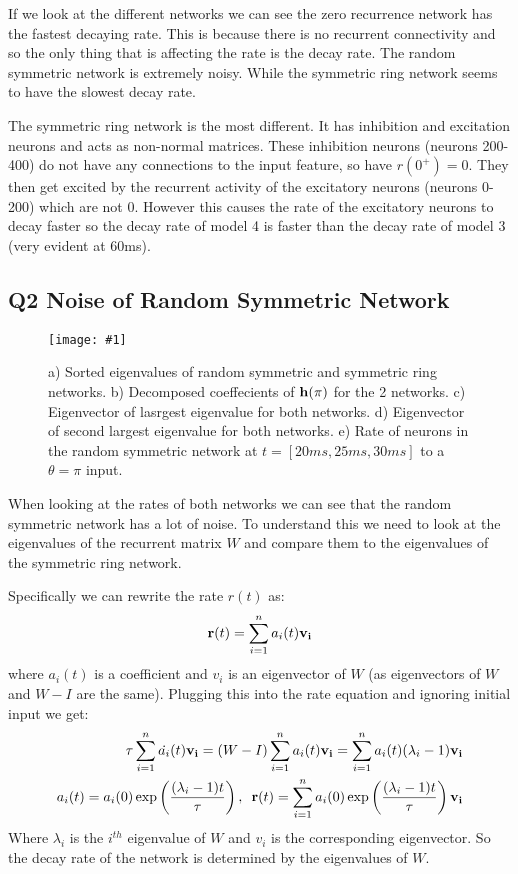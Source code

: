 \documentclass[a4paper, 11pt, oneside]{report}
\newcommand{\centreImage}[2]{
	\begin{figure}[H]
		\centering
		\texttt{[image: \#1]}
		\caption{#2}
        \label{fig:#1}
	\end{figure}
}
\begin{document}
If we look at the different networks we can see the zero recurrence network has the fastest
decaying rate. This is because there is no recurrent connectivity and so the only thing that is affecting the rate is
the decay rate. The random symmetric network is extremely noisy. While the 
symmetric ring network seems to have the slowest decay rate.

The symmetric ring network is the most different. It has inhibition and excitation neurons and acts as non-normal matrices.
These inhibition neurons (neurons 200-400) do not have any connections to the input feature, so
have $r(0^+)=0$. They then get excited by the recurrent activity of the excitatory neurons (neurons 0-200)
which are not 0. However this causes the rate of the excitatory neurons to decay faster so the
decay rate of model 4 is faster than the decay rate of model 3 (very evident at 60ms).

\subsection*{Q2 Noise of Random Symmetric Network}

\centreImage{eigenvalues.png}{a) Sorted eigenvalues of random symmetric and symmetric ring networks. b) Decomposed coeffecients of $\mathbf{h}(\pi)$ for the 2 networks. c) Eigenvector of lasrgest eigenvalue for both networks. d) Eigenvector of second largest eigenvalue for both networks.
e) Rate of neurons in the random symmetric network at $t=[20ms, 25ms, 30ms]$ to a $\theta=\pi$ input.}

When looking at the rates of both networks we can see that the random symmetric network has a lot of noise.
To understand this we need to look at the eigenvalues of the recurrent matrix $W$ and compare them to the eigenvalues of the symmetric ring network.

Specifically we can rewrite the rate $r(t)$ as:
\begin{equation}
    \mathbf{r}(t) = \sum_{i=1}^n a_i(t) \mathbf{v_i}
\end{equation}
where $a_i(t)$ is a coefficient and $v_i$ is an eigenvector of $W$ (as eigenvectors of $W$ and $W-I$ are the same).
Plugging this into the rate equation and ignoring initial input we get:
\begin{align}
    \tau \sum_{i=1}^n \dot{a_i}(t) \mathbf{v_i} = (W-I) \sum_{i=1}^n a_i(t) \mathbf{v_i} = \sum_{i=1}^n a_i(t) (\lambda_i-1) \mathbf{v_i} \\
    a_i(t) = a_i(0) \exp\left(\frac{(\lambda_i-1)t}{\tau}\right), \, \, \, \mathbf{r}(t) = \sum_{i=1}^n a_i(0) \exp\left(\frac{(\lambda_i-1)t}{\tau}\right) \mathbf{v_i}
\end{align}
Where $\lambda_i$ is the $i^{th}$ eigenvalue of $W$ and $v_i$ is the corresponding eigenvector.
So the decay rate of the network is determined by the eigenvalues of $W$.
\end{document}
